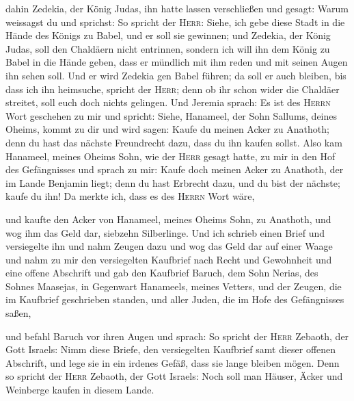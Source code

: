  dahin Zedekia, der König Judas, ihn hatte lassen
verschließen und gesagt: Warum weissagst du und sprichst: So spricht der
\textsc{Herr}: Siehe, ich gebe diese Stadt in die Hände des Königs zu
Babel, und er soll sie gewinnen;  und Zedekia, der König
Judas, soll den Chaldäern nicht entrinnen, sondern ich will ihn dem
König zu Babel in die Hände geben, dass er mündlich mit ihm reden und
mit seinen Augen ihn sehen soll.  Und er wird Zedekia gen
Babel führen; da soll er auch bleiben, bis dass ich ihn heimsuche,
spricht der \textsc{Herr}; denn ob ihr schon wider die Chaldäer
streitet, soll euch doch nichts gelingen.  Und Jeremia
sprach: Es ist des \textsc{Herrn} Wort geschehen zu mir und spricht:
 Siehe, Hanameel, der Sohn Sallums, deines Oheims, kommt
zu dir und wird sagen: Kaufe du meinen Acker zu Anathoth; denn du hast
das nächste Freundrecht dazu, dass du ihn kaufen sollst. 
Also kam Hanameel, meines Oheims Sohn, wie der \textsc{Herr} gesagt
hatte, zu mir in den Hof des Gefängnisses und sprach zu mir: Kaufe doch
meinen Acker zu Anathoth, der im Lande Benjamin liegt; denn du hast
Erbrecht dazu, und du bist der nächste; kaufe du ihn! Da merkte ich,
dass es des \textsc{Herrn} Wort wäre,

 und kaufte den Acker von Hanameel, meines Oheims Sohn, zu
Anathoth, und wog ihm das Geld dar, siebzehn Silberlinge.
 Und ich schrieb einen Brief und versiegelte ihn und nahm
Zeugen dazu und wog das Geld dar auf einer Waage  und
nahm zu mir den versiegelten Kaufbrief nach Recht und Gewohnheit und
eine offene Abschrift  und gab den Kaufbrief Baruch, dem
Sohn Nerias, des Sohnes Maasejas, in Gegenwart Hanameels, meines
Vetters, und der Zeugen, die im Kaufbrief geschrieben standen, und aller
Juden, die im Hofe des Gefängnisses saßen,

 und befahl Baruch vor ihren Augen und sprach:
 So spricht der \textsc{Herr} Zebaoth, der Gott Israels:
Nimm diese Briefe, den versiegelten Kaufbrief samt dieser offenen
Abschrift, und lege sie in ein irdenes Gefäß, dass sie lange bleiben
mögen.  Denn so spricht der \textsc{Herr} Zebaoth, der
Gott Israels: Noch soll man Häuser, Äcker und Weinberge kaufen in diesem
Lande.

